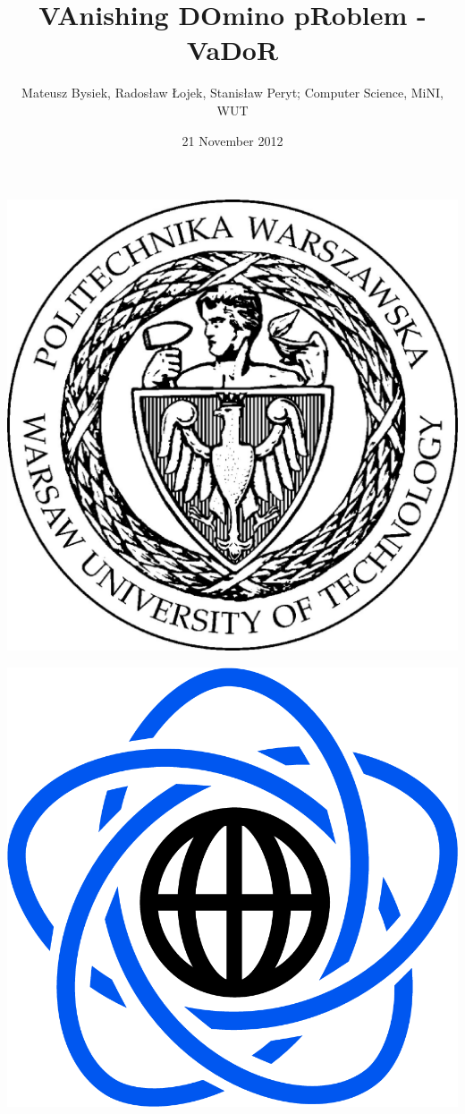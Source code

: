\documentclass{article}
\begin{document}
\title{VAnishing DOmino pRoblem - VaDoR}
\author{Mateusz Bysiek, Radosław Łojek, Stanisław Peryt; Computer Science, MiNI, WUT}
\date{21 November 2012}
\maketitle

\begin{multicols}{2}
\begin{flushleft}
\includegraphics[scale=0.60]{logo_pw.jpg}
\end{flushleft}
\begin{flushright}
\includegraphics[scale=0.25]{logo_mini.png}
\end{flushright}
\end{multicols}
\end{document}
